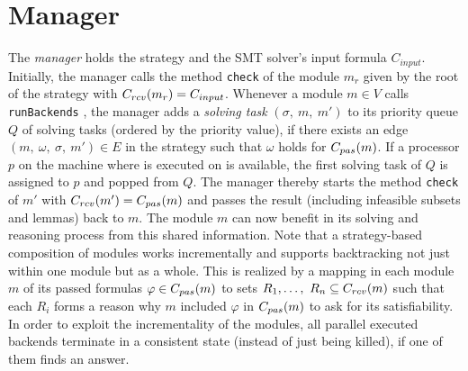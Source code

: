 \section{Manager}
\label{sec::manager}
The \emph{manager} holds the strategy and the SMT solver's input formula $C_{input}$. Initially, the manager calls the method \texttt{check} of the module $m_r$ given by the root of the strategy with $C_{rcv}(m_r) = C_{input}$. Whenever a module $m\in V$ calls \texttt{runBackends}%
, the manager adds a \emph{solving task} $(\sigma,\ m,\ m')$ to its priority queue $Q$ of solving tasks (ordered by the priority value), if there exists an edge $(m,\ \omega,\ \sigma,\ m')\in E$  in the strategy such that $\omega$ holds for $C_{pas}(m)$. If a processor $p$ on the machine where \smtrat is executed on is available, the first solving task of $Q$ is assigned to $p$ and popped from $Q$. The manager thereby starts the method \texttt{check} of $m'$ with $C_{rcv}(m') = C_{pas}(m)$ and passes the result (including infeasible subsets and lemmas) back to $m$. The module $m$ can now benefit in its solving and reasoning process from this shared information. Note that a strategy-based composition of modules works incrementally and supports backtracking not just within one module but as a whole. This is realized by a mapping in each module $m$ of its passed formulas $\varphi\in C_{pas}(m)$ to sets $R_1,\ldots,\ R_n \subseteq C_{rcv}(m)$ such that each $R_i$ forms a reason why $m$ included $\varphi$ in $C_{pas}(m)$ to ask for its satisfiability. In order to exploit the incrementality of the modules, all parallel executed backends terminate in a consistent state (instead of just being killed), if one of them finds an answer.
  
